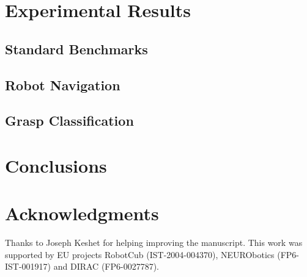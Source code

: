 \documentclass[doublespacing]{elsart}
\begin{document}
%

\section{Experimental Results}
\label{sec:exp}


\subsection{Standard Benchmarks}
\label{sec:exp1}


\subsection{Robot Navigation}
\label{sec:exp2}


\subsection{Grasp Classification}
\label{sec:exp3}


\section{Conclusions}
\label{sec:conclusions}


\section*{Acknowledgments}
Thanks to Joseph Keshet for helping improving the manuscript.
This work was supported by EU projects RobotCub (IST-2004-004370),
NEURObotics (FP6-IST-001917) and DIRAC (FP6-0027787).

{\small


}
\end{document}
